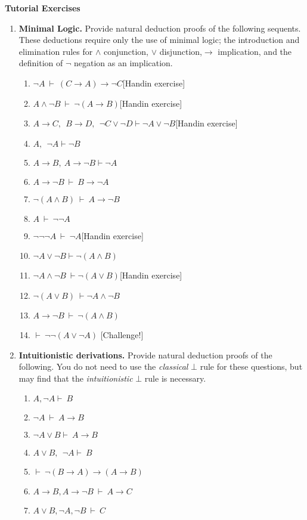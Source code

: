 \documentclass[11pt]{report}
\begin{document}
\newpage
{\bf Tutorial Exercises}
\begin{enumerate}

	\item \textbf{Minimal Logic.} Provide natural deduction proofs of the following sequents. These deductions require only the use of minimal logic; the introduction and elimination rules for $\land$ conjunction, $\lor$ disjunction,$\to$ implication, and the definition of $\lnot$ negation as an implication. 
	 
	\begin{enumerate}
		\item $\lnot A \ \vdash \ (C \to A) \to \lnot C$\hfill [Handin exercise]
		\item $A \land \lnot B \ \vdash \ \lnot (A \to B)$\hfill [Handin exercise]
		\item $ A\to  C,\ \  B \to  D,\ \ \neg C \lor \neg  D \vdash  \neg A\lor \neg  B$\hfill [Handin exercise]
		\item $ A,\ \ \neg  A\vdash  \neg  B$
		\item $ A\rightarrow B, \  A\rightarrow \lnot B \vdash \lnot  A$
		\item $A \to \lnot B \ \vdash \ B \to \lnot A$
		\item $\lnot (A \land B) \ \vdash \ A \to \lnot B$
		\item $A \ \vdash \ \lnot\lnot A$
		\item $\lnot \lnot \lnot A \ \vdash \ \lnot A$\hfill [Handin exercise]
		\item $\lnot A \lor \lnot B \vdash \lnot( A\land  B)$
		\item $\lnot  A\land \lnot  B \ \vdash \lnot( A \lor  B)$\hfill [Handin exercise]
		\item $\lnot( A \lor  B) \ \vdash \lnot  A\land \lnot  B$
		\item $A \to \lnot B \ \vdash \ \lnot (A \land B)$
		\item $\vdash \ \lnot\lnot (A \lor \lnot A)$ \hfill [Challenge!]
	\end{enumerate}

	\item \textbf{Intuitionistic derivations.} Provide natural deduction proofs of the following. You do not need to use the \emph{classical} $\bot$ rule for these questions, but may find that the \emph{intuitionistic} $\bot$ rule is necessary.
	 
	\begin{enumerate}
		\item $ A, \neg  A\vdash \ B$
		\item $\lnot A \ \vdash \ A \to B$ 
		\item $\neg  A\lor  B \vdash \ A\to B$ 
		\item $ A\lor  B,\ \ \neg A\vdash \ B$ 
		\item $ \vdash \ \lnot(B \to A) \to (A \to B)$
		\item $ A \to B, A \to \lnot B \ \vdash \ A \to C$
		\item $A \lor B, \lnot A, \lnot B \ \vdash \ C$
	\end{enumerate}

\end{enumerate}	
\end{document}
